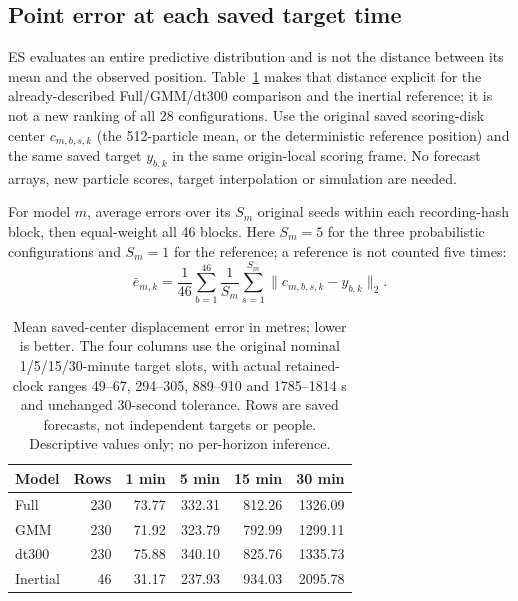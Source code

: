 \FloatBarrier
\subsection{Point error at each saved target time}
\label{sec:point-error-horizons}
ES evaluates an entire predictive distribution and is not the distance between its mean and the observed position. Table~\ref{tab:point-error-horizons} makes that distance explicit for the already-described Full/GMM/dt300 comparison and the inertial reference; it is not a new ranking of all 28 configurations. Use the original saved scoring-disk center $c_{m,b,s,k}$ (the 512-particle mean, or the deterministic reference position) and the same saved target $y_{b,k}$ in the same origin-local scoring frame. No forecast arrays, new particle scores, target interpolation or simulation are needed.

For model $m$, average errors over its $S_m$ original seeds within each recording-hash block, then equal-weight all 46 blocks. Here $S_m=5$ for the three probabilistic configurations and $S_m=1$ for the reference; a reference is not counted five times:
\begin{equation}
\bar e_{m,k}=\frac{1}{46}\sum_{b=1}^{46}
\frac{1}{S_m}\sum_{s=1}^{S_m}\lVert c_{m,b,s,k}-y_{b,k}\rVert_2.
\label{eq:point-error-horizon-mean}
\end{equation}

\begin{table}[htbp]\centering\small
\caption{Mean saved-center displacement error in metres; lower is better. The four columns use the original nominal 1/5/15/30-minute target slots, with actual retained-clock ranges 49--67, 294--305, 889--910 and 1785--1814 s and unchanged 30-second tolerance. Rows are saved forecasts, not independent targets or people. Descriptive values only; no per-horizon inference.}\label{tab:point-error-horizons}
\begin{tabular}{@{}lrrrrr@{}}\toprule
Model & Rows & 1 min & 5 min & 15 min & 30 min\\\midrule
Full & 230 & 73.77 & 332.31 & 812.26 & 1326.09\\
GMM & 230 & 71.92 & 323.79 & 792.99 & 1299.11\\
dt300 & 230 & 75.88 & 340.10 & 825.76 & 1335.73\\
Inertial & 46 & 31.17 & 237.93 & 934.03 & 2095.78\\
\bottomrule\end{tabular}\end{table}

